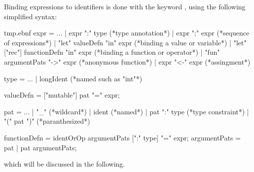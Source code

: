 Binding expressions to identifiers is done with the keyword , using the following simplified syntax:
%
\begin{verbatimwrite}{tmp.ebnf}
expr = ...
  | expr ":" type (*type annotation*)
  | expr ";" expr (*sequence of expressions*)
  | "let" valueDefn "in" expr (*binding a value or variable*)
  | "let" ["rec"] functionDefn "in" expr (*binding a function or operator*)
  | "fun" argumentPats "->" expr (*anonymous function*)
  | expr "<-" expr (*assingment*)
 
type = ...
  | longIdent (*named such as "int"*)

valueDefn = ["mutable"] pat "=" expr;

pat = ...
  | "_" (*wildcard*)
  | ident (*named*)
  | pat ":" type (*type constraint*)
  | "(" pat ")" (*paranthesized*)

functionDefn = identOrOp argumentPats [":" type] "=" expr;
argumentPats = pat | pat argumentPats;
\end{verbatimwrite}
%
which will be discussed in the following.  

